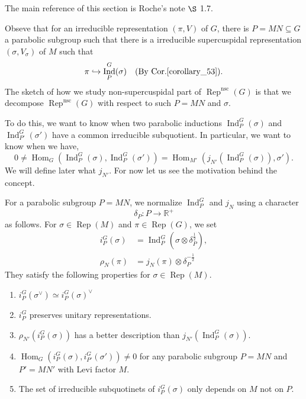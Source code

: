 \documentclass[8pt]{article}
\DeclareMathOperator{\Ind}{Ind}
\DeclareMathOperator{\Rep}{Rep}
\DeclareMathOperator{\Hom}{Hom}
\DeclareMathOperator{\nsc}{nsc}
\newcommand{\R}[0]{\mathbb{R}}
\begin{document}
The main reference of this section is Roche's note $\S$ 1.7.\\
\par Obseve that for an irreducible representation $(\pi,V)$ of $G$, there is $P=MN\subseteq G$ a parabolic subgroup such that 
there is a irreducible supercuspidal representation $(\sigma,V_\sigma)$ of $M$ such that
\begin{equation*}
  \pi\hookrightarrow\Ind_P^G(\sigma)\quad(\text{By Cor.\ref{corollary_53}}).
\end{equation*}
The sketch of how we study non-supercuspidal part of $\Rep^{\nsc}(G)$ is that we decompose $\Rep^{\nsc}(G)$ with respect to such $P=MN$ and $\sigma$.
\par To do this, we want to know when two parabolic inductions $\Ind_P^G(\sigma)$ and $\Ind_{P'}^G(\sigma')$ have a common irreducible subquotient. In particular, we want to know when we have,
\begin{equation*}
  0\not=\Hom_G(\Ind_P^G(\sigma),\Ind_P^G(\sigma'))=\Hom_{M'}(j_{N'}(\Ind_P^G(\sigma)), \sigma').
\end{equation*}
We will define later what $j_{N'}$. For now let us see the motivation behind the concept. 
\par For a parabolic subgroup $P=MN$, we normalize $\Ind_{P}^G$ and $j_N$ using a character
\begin{equation*}
  \delta_P:P\to\R^+
\end{equation*}
as follows. For $\sigma\in\Rep(M)$ and $\pi\in\Rep(G)$, we set
\begin{align*}
  i_P^G(\sigma) &= \Ind_P^G(\sigma\otimes\delta_{P}^{{\frac 1 2}}),\\
  \rho_N(\pi)& = j_N(\pi)\otimes \delta_P^{-{\frac 1 2}}
\end{align*}
They satisfy the following properties for $\sigma\in\Rep(M)$.
\begin{enumerate}[1).]
  \item $i_P^G(\sigma^\vee)\simeq i_P^G(\sigma)^\vee$
  \item $i_P^G$ preserves unitary representations.
  \item $\rho_{N'}(i_P^G(\sigma))$ has a better description than $j_{N'}(\Ind_P^G(\sigma))$.
  \item $\Hom_G(i_P^G(\sigma),i_{P'}^G(\sigma'))\not=0$ for any parabolic subgroup $P=MN$ and $P' = MN'$ with Levi factor $M$.
  \item The set of irreducible subquotinets of $i_P^G(\sigma)$ only depends on $M$ not on $P$.
\end{enumerate}
\end{document}
